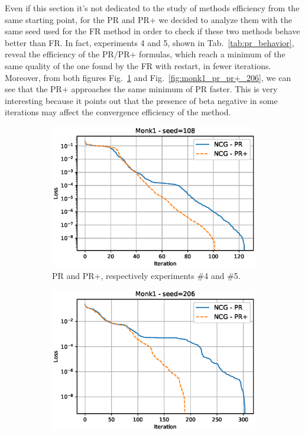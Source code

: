 \documentclass[11pt]{article}
\begin{document}
Even if this section it's not dedicated to the study of methods efficiency from the same starting point, for the PR and PR+ we decided to analyze them with the same seed used for the FR method in order to check if these two methods behave better than FR. In fact, experiments 4 and 5, shown in Tab.~\ref{tab:pr_behavior}, reveal the efficiency of the PR/PR+ formulas, which reach a minimum of the same quality of the one found by the FR with restart, in fewer iterations. Moreover, from both figures Fig.~\ref{fig:monk1_pr_pr+_108} and Fig.~\ref{fig:monk1_pr_pr+_206}, we can see that the PR+ approaches the same minimum of PR faster.
This is very interesting because it points out that the presence of beta negative in some iterations may affect the convergence efficiency of the method.
\begin{figure}[H]
     \centering
     \begin{subfigure}[b]{.497\textwidth}
         \centering
         \includegraphics[width=1.1\linewidth]{Images/monk1_pr_pr+_1.eps}
         \caption{PR and PR+, respectively experiments \#4 and \#5.}
         \label{fig:monk1_pr_pr+_108}
     \end{subfigure}
     \hfill
     \begin{subfigure}[b]{.497\textwidth}
         \centering
         \includegraphics[width=1.1\linewidth]{Images/monk1_pr_pr+_2.eps}

\end{subfigure}
\end{figure}
\end{document}
